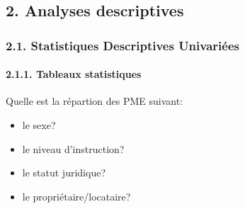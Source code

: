 \documentclass[
  letterpaper,
  DIV=11,
  numbers=noendperiod]{scrartcl}
\let\oldparagraph\paragraph
\renewcommand{\paragraph}[1]{\oldparagraph{#1}\mbox{}}
\begin{document}
\hypertarget{analyses-descriptives}{%
\subsection{2. Analyses descriptives}\label{analyses-descriptives}}

\hypertarget{statistiques-descriptives-univariuxe9es}{%
\subsubsection{2.1. Statistiques Descriptives
Univariées}\label{statistiques-descriptives-univariuxe9es}}

\hypertarget{tableaux-statistiques}{%
\paragraph{2.1.1. Tableaux statistiques}\label{tableaux-statistiques}}

Quelle est la répartion des PME suivant:

\begin{itemize}
\item
  le sexe?
\item
  le niveau d'instruction?
\item
  le statut juridique?
\item
  le propriétaire/locataire?
\end{itemize}
\end{document}
